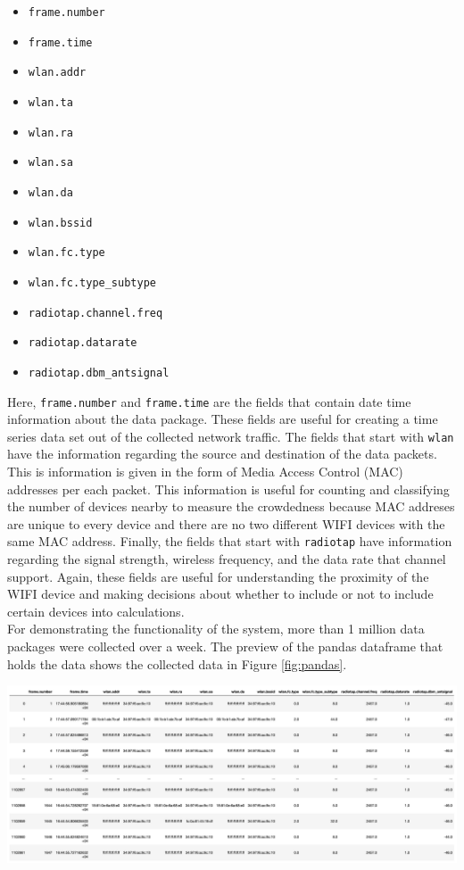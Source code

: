 \documentclass[journal, 12pt]{IEEEtran}
\begin{document}
\begin{itemize}
    \item \texttt{frame.number}
    \item \texttt{frame.time}
    \item \texttt{wlan.addr}
    \item \texttt{wlan.ta}
    \item \texttt{wlan.ra}
    \item \texttt{wlan.sa}
    \item \texttt{wlan.da}
    \item \texttt{wlan.bssid}
    \item \texttt{wlan.fc.type}
    \item \texttt{wlan.fc.type\_subtype}
    \item \texttt{radiotap.channel.freq}
    \item \texttt{radiotap.datarate}
    \item \texttt{radiotap.dbm\_antsignal}
\end{itemize}
\medskip
\noindent Here, \texttt{frame.number} and \texttt{frame.time} are the fields that contain date time information about the data package. These fields are useful for creating a time series data set out of the collected network traffic. The fields that start with \texttt{wlan} have the information regarding the source and destination of the data packets. This is information is given in the form of Media Access Control (MAC) addresses per each packet. This information is useful for counting and classifying the number of devices nearby to measure the crowdedness because MAC addreses are unique to every device and there are no two different WIFI devices with the same MAC address. Finally, the fields that start with \texttt{radiotap} have information regarding the signal strength, wireless frequency, and the data rate that channel support. Again, these fields are useful for understanding the proximity of the WIFI device and making decisions about whether to include or not to include certain devices into calculations.\\

\noindent For demonstrating the functionality of the system, more than 1 million data packages were collected over a week. The preview of the pandas dataframe that holds the data shows the collected data in Figure \ref{fig:pandas}.

\begingroup
    \center
    \medskip
    \includegraphics[width=\columnwidth]{report/interim_report/images/pandas.png}
    \label{fig:pandas}
    \medskip
\endgroup
\end{document}
